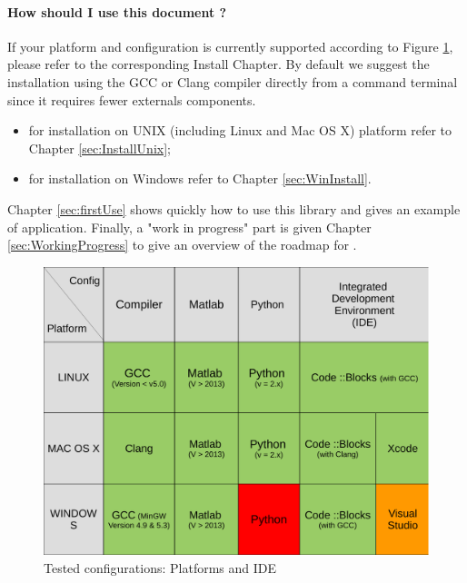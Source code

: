 \paragraph{How should I use this document ?}
If your platform and configuration is currently supported according to Figure \ref{fig:recapInstall}, please refer to the corresponding Install Chapter. By default we suggest the installation using the GCC or Clang compiler directly from a command terminal since it requires fewer externals components. 
\begin{itemize}
\item for installation on UNIX (including Linux and Mac OS X) platform refer to Chapter \ref{sec:InstallUnix};
\item for installation on Windows refer to Chapter \ref{sec:WinInstall}. 
\end{itemize}
Chapter \ref{sec:firstUse} shows quickly how to use this library and gives an example of application. Finally, a "work in progress" part is given Chapter \ref{sec:WorkingProgress} to give an overview of the roadmap for \FAuST. 

\begin{figure}[H] %
\centering
\includegraphics[scale=0.4]{images/recapInstall_v2-1.pdf}
\caption{Tested configurations: Platforms and IDE}
\label{fig:recapInstall}
\end{figure}

